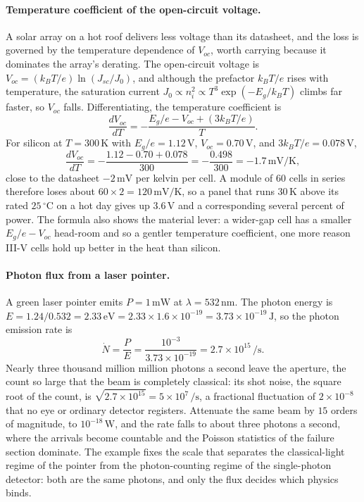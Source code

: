 \paragraph{Temperature coefficient of the open-circuit voltage.}
A solar array on a hot roof delivers less voltage than its datasheet, and the
loss is governed by the temperature dependence of $V_{oc}$, worth carrying
because it dominates the array's derating. The open-circuit voltage is
$V_{oc} = (k_B T/e)\ln(J_{sc}/J_0)$, and although the prefactor $k_B T/e$
rises with temperature, the saturation current $J_0 \propto n_i^{2} \propto
T^{3}\exp(-E_g/k_B T)$ climbs far faster, so $V_{oc}$ falls. Differentiating,
the temperature coefficient is
\[
\frac{dV_{oc}}{dT} = -\frac{E_g/e - V_{oc} + (3k_B T/e)}{T}.
\]
For silicon at $T = 300\,\si{\kelvin}$ with $E_g/e = 1.12\,\si{\volt}$,
$V_{oc} = 0.70\,\si{\volt}$, and $3k_B T/e = 0.078\,\si{\volt}$,
\[
\frac{dV_{oc}}{dT}
= -\frac{1.12 - 0.70 + 0.078}{300}
= -\frac{0.498}{300}
= -1.7\,\si{\milli\volt\per\kelvin},
\]
close to the datasheet $-2\,\si{\milli\volt}$ per kelvin per cell. A module
of $60$ cells in series therefore loses about $60\times 2 = 120\,\si{\milli
\volt\per\kelvin}$, so a panel that runs $30\,\si{\kelvin}$ above its rated
$25\,{}^{\circ}\mathrm{C}$ on a hot day gives up $3.6\,\si{\volt}$ and a
corresponding several percent of power. The formula also shows the material
lever: a wider-gap cell has a smaller $E_g/e - V_{oc}$ head-room and so a
gentler temperature coefficient, one more reason III-V cells hold up better
in the heat than silicon.

\paragraph{Photon flux from a laser pointer.}
A green laser pointer emits $P = 1\,\si{\milli\watt}$ at $\lambda = 532\,\si{
\nano\meter}$. The photon energy is $E = 1.24/0.532 = 2.33\,\si{
\electronvolt} = 2.33\times 1.6\times 10^{-19} = 3.73\times 10^{-19}\,\si{
\joule}$, so the photon emission rate is
\[
\dot N = \frac{P}{E}
       = \frac{10^{-3}}{3.73\times 10^{-19}}
       = 2.7\times 10^{15}\,\si{\per\second}.
\]
Nearly three thousand million million photons a second leave the aperture,
the count so large that the beam is completely classical: its shot noise,
the square root of the count, is $\sqrt{2.7\times 10^{15}} = 5\times
10^{7}\,\si{\per\second}$, a fractional fluctuation of $2\times 10^{-8}$
that no eye or ordinary detector registers. Attenuate the same beam by
$15$ orders of magnitude, to $10^{-18}\,\si{\watt}$, and the rate falls to
about three photons a second, where the arrivals become countable and the
Poisson statistics of the failure section dominate. The example fixes the
scale that separates the classical-light regime of the pointer from the
photon-counting regime of the single-photon detector: both are the same
photons, and only the flux decides which physics binds.

